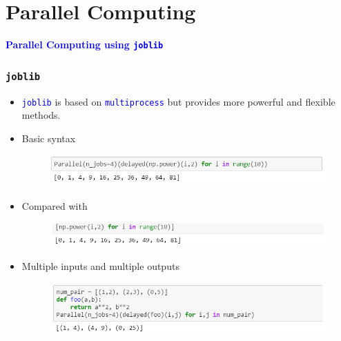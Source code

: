 \documentclass[red]{beamer}
\begin{document}
\section{Parallel Computing}
\begin{frame}
\centering
\LARGE \textcolor{blue}{\textbf{Parallel Computing using \texttt{joblib}}}
\end{frame}

\begin{frame}
\frametitle{\texttt{joblib}}
\begin{itemize}
	\item \textcolor{blue}{\texttt{joblib}} is based on \textcolor{blue}{\texttt{multiprocess} }but provides more powerful and flexible methods.
	\item Basic syntax
	\begin{figure}
		\centering
		\includegraphics[width=1\linewidth]{figure/screenshot023}
	\end{figure}
	\item Compared with
	\begin{figure}
		\centering
		\includegraphics[width=1\linewidth]{figure/screenshot024}
	\end{figure}	
	\item Multiple inputs and multiple outputs
	\begin{figure}
		\centering
		\includegraphics[width=1\linewidth]{figure/screenshot025}
	\end{figure}
\end{itemize}
\end{frame}
\end{document}
